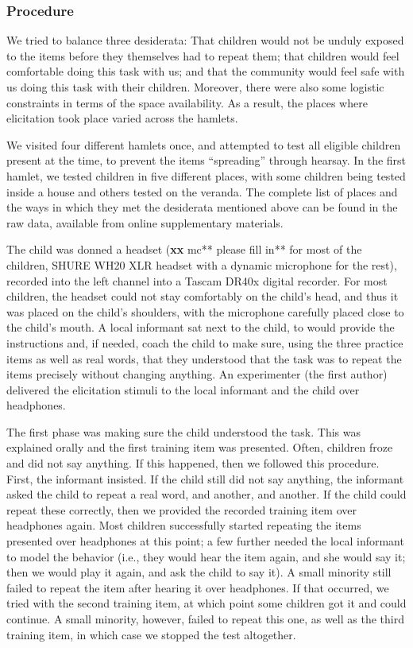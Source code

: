 \documentclass[english,,man,floatsintext]{apa6}
\begin{document}
\hypertarget{procedure}{%
\subsubsection{Procedure}\label{procedure}}

We tried to balance three desiderata: That children would not be unduly exposed to the items before they themselves had to repeat them; that children would feel comfortable doing this task with us; and that the community would feel safe with us doing this task with their children. Moreover, there were also some logistic constraints in terms of the space availability. As a result, the places where elicitation took place varied across the hamlets.

We visited four different hamlets once, and attempted to test all eligible children present at the time, to prevent the items \enquote{spreading} through hearsay. In the first hamlet, we tested children in five different places, with some children being tested inside a house and others tested on the veranda. The complete list of places and the ways in which they met the desiderata mentioned above can be found in the raw data, available from online supplementary materials.

The child was donned a headset (\textbf{xx }mc** please fill in** for most of the children, SHURE WH20 XLR headset with a dynamic microphone for the rest), recorded into the left channel into a Tascam DR40x digital recorder. For most children, the headset could not stay comfortably on the child's head, and thus it was placed on the child's shoulders, with the microphone carefully placed close to the child's mouth. A local informant sat next to the child, to would provide the instructions and, if needed, coach the child to make sure, using the three practice items as well as real words, that they understood that the task was to repeat the items precisely without changing anything. An experimenter (the first author) delivered the elicitation stimuli to the local informant and the child over headphones.

The first phase was making sure the child understood the task. This was explained orally and the first training item was presented. Often, children froze and did not say anything. If this happened, then we followed this procedure. First, the informant insisted. If the child still did not say anything, the informant asked the child to repeat a real word, and another, and another. If the child could repeat these correctly, then we provided the recorded training item over headphones again. Most children successfully started repeating the items presented over headphones at this point; a few further needed the local informant to model the behavior (i.e., they would hear the item again, and she would say it; then we would play it again, and ask the child to say it). A small minority still failed to repeat the item after hearing it over headphones. If that occurred, we tried with the second training item, at which point some children got it and could continue. A small minority, however, failed to repeat this one, as well as the third training item, in which case we stopped the test altogether.
\end{document}
